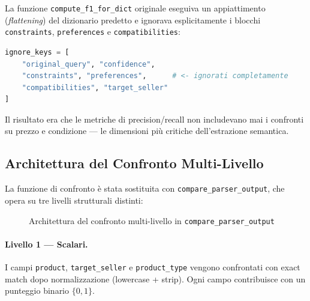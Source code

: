 La funzione \texttt{compute\_f1\_for\_dict} originale eseguiva un
appiattimento (\emph{flattening}) del dizionario predetto e ignorava
esplicitamente i blocchi \texttt{constraints}, \texttt{preferences} e
\texttt{compatibilities}:

\begin{lstlisting}[language=Python, caption={Chiavi ignorate nel confronto originale}]
ignore_keys = [
    "original_query", "confidence",
    "constraints", "preferences",      # <- ignorati completamente
    "compatibilities", "target_seller"
]
\end{lstlisting}

Il risultato era che le metriche di precision/recall non includevano
mai i confronti su prezzo e condizione — le dimensioni più
critiche dell'estrazione semantica.

\subsection{Architettura del Confronto Multi-Livello}
\label{subsec:multilevel-compare}

La funzione di confronto è stata sostituita con \texttt{compare\_parser\_output},
che opera su tre livelli strutturali distinti:

\begin{figure}[htbp]
    \centering
    \caption{Architettura del confronto multi-livello in \texttt{compare\_parser\_output}}
    \label{fig:multilevel-compare}
\end{figure}

\paragraph{Livello 1 — Scalari.}
I campi \texttt{product}, \texttt{target\_seller} e \texttt{product\_type}
vengono confrontati con exact match dopo normalizzazione (lowercase + strip).
Ogni campo contribuisce con un punteggio binario $\{0, 1\}$.

